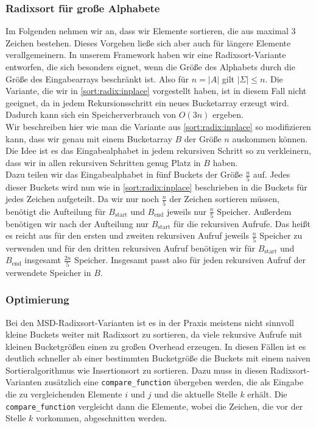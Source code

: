 \subsubsection{Radixsort für große Alphabete}
\label{sort:radix:big_alph}

Im Folgenden nehmen wir an, dass wir Elemente sortieren, die aus maximal $3$ Zeichen bestehen. Dieses Vorgehen ließe sich aber auch für längere Elemente verallgemeinern. In unserem Framework haben wir eine Radixsort-Variante entworfen, die sich besonders eignet, wenn die Größe des Alphabets durch die Größe des Eingabearrays beschränkt ist. Also für $n=|A|$ gilt $|\Sigma| \le n$. Die Variante, die wir in \cref{sort:radix:inplace} vorgestellt haben, ist in diesem Fall nicht geeignet, da in jedem Rekursionsschritt ein neues Bucketarray erzeugt wird. Dadurch kann sich ein Speicherverbrauch von $O(3n)$ ergeben. \\
Wir beschreiben hier wie man die Variante aus \cref{sort:radix:inplace} so modifizieren kann, dass wir genau mit einem Bucketarray $B$ der Größe $n$ auskommen können. Die Idee ist es das Eingabealphabet in jedem rekursiven Schritt so zu verkleinern, dass wir in allen rekursiven Schritten genug Platz in $B$ haben. \\
Dazu teilen wir das Eingabealphabet in fünf Buckets der Größe $\frac{n}{5}$ auf. Jedes dieser Buckets wird nun wie in \cref{sort:radix:inplace} beschrieben in die Buckets für jedes Zeichen aufgeteilt. Da wir nur noch $\frac{n}{5}$ der Zeichen sortieren müssen, benötigt die Aufteilung für $B_{\text{start}}$ und $B_{\text{end}}$ jeweils nur $\frac{n}{5}$ Speicher. Außerdem benötigen wir nach der Aufteilung nur $B_{\text{start}}$ für die rekursiven Aufrufe. Das heißt es reicht aus für den ersten und zweiten rekursiven Aufruf jeweils $\frac{n}{5}$ Speicher zu verwenden und für den dritten rekursiven Aufruf benötigen wir für $B_{\text{start}}$ und $B_{\text{end}}$ insgesamt $\frac{2n}{5}$ Speicher. Insgesamt passt also für jeden rekursiven Aufruf der verwendete Speicher in $B$. \\


\subsubsection{Optimierung}

Bei den MSD-Radixsort-Varianten ist es in der Praxis meistens nicht sinnvoll kleine Buckets weiter mit Radixsort zu sortieren, da viele rekursive Aufrufe mit kleinen Bucketgrößen einen zu großen Overhead erzeugen. In diesen Fällen ist es deutlich schneller ab einer bestimmten Bucketgröße die Buckets mit einem naiven Sortieralgorithmus wie Insertionsort zu sortieren. Dazu muss in diesen Radixsort-Varianten zusätzlich eine \texttt{compare\_function} übergeben werden, die als Eingabe die zu vergleichenden Elemente $i$ und $j$ und die aktuelle Stelle $k$ erhält. Die \texttt{compare\_function} vergleicht dann die Elemente, wobei die Zeichen, die vor der Stelle $k$ vorkommen, abgeschnitten werden.